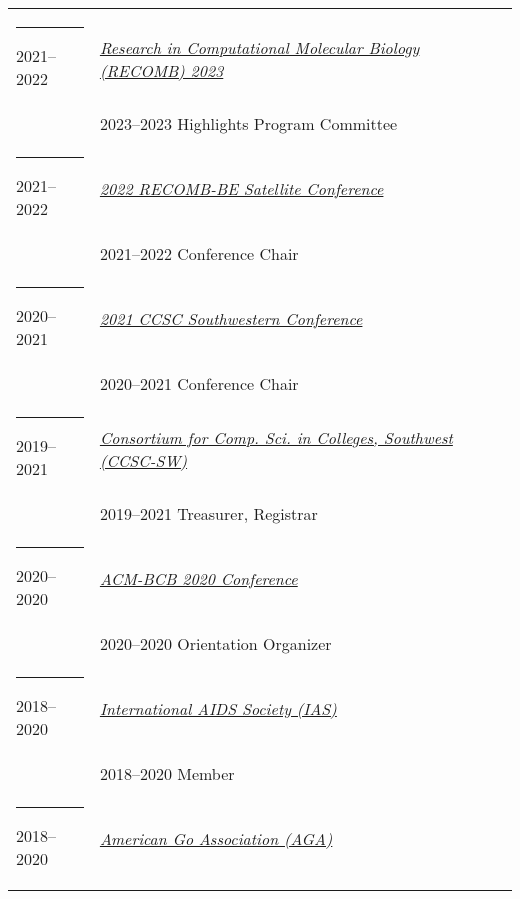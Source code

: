 \documentclass[margin,line]{res}
\begin{document}
\begin{resume}
\begin{longtable}{@{}p{0.7in}p{4in}}
\hspace*{-4mm} \rule{-1mm}{5mm} 2021--2022 & \href{http://recomb2023.bilkent.edu.tr/}{\textit{Research in Computational Molecular Biology (RECOMB) 2023}}\\*
\hspace*{-4mm} & \hspace{4mm} 2023--2023 Highlights Program Committee\\
\hspace*{-4mm} \rule{-1mm}{5mm} 2021--2022 & \href{https://sites.google.com/eng.ucsd.edu/recomb-be-2022}{\textit{2022 RECOMB-BE Satellite Conference}}\\*
\hspace*{-4mm} & \hspace{4mm} 2021--2022 Conference Chair\\
\hspace*{-4mm} \rule{-1mm}{5mm} 2020--2021 & \href{http://www.ccsc.org/southwestern/index.php}{\textit{2021 CCSC Southwestern Conference}}\\*
\hspace*{-4mm} & \hspace{4mm} 2020--2021 Conference Chair\\
\hspace*{-4mm} \rule{-1mm}{5mm} 2019--2021 & \href{http://www.ccsc.org/southwestern/index.php}{\textit{Consortium for Comp. Sci. in Colleges, Southwest (CCSC-SW)}}\\*
\hspace*{-4mm} & \hspace{4mm} 2019--2021 Treasurer, Registrar\\
\hspace*{-4mm} \rule{-1mm}{5mm} 2020--2020 & \href{https://acm-bcb.org/2020}{\textit{ACM-BCB 2020 Conference}}\\*
\hspace*{-4mm} & \hspace{4mm} 2020--2020 Orientation Organizer\\
\hspace*{-4mm} \rule{-1mm}{5mm} 2018--2020 & \href{https://www.iasociety.org/}{\textit{International AIDS Society (IAS)}}\\*
\hspace*{-4mm} & \hspace{4mm} 2018--2020 Member\\
\hspace*{-4mm} \rule{-1mm}{5mm} 2018--2020 & \href{http://www.usgo.org/}{\textit{American Go Association (AGA)}}\\*

\end{longtable}
\end{resume}
\end{document}
